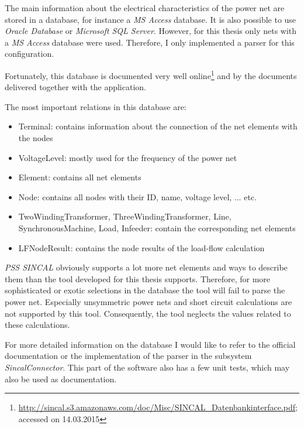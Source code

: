 The main information about the electrical characteristics of the power net are stored in a database, for instance a \emph{MS Access} database. It is also possible to use \emph{Oracle Database} or \emph{Microsoft SQL Server}. However, for this thesis only nets with a \emph{MS Access} database were used. Therefore, I only implemented a parser for this configuration.

Fortunately, this database is documented very well online\footnote{\url{http://sincal.s3.amazonaws.com/doc/Misc/SINCAL_Datenbankinterface.pdf}; accessed on 14.03.2015} and by the documents delivered together with the application.

The most important relations in this database are:
\begin{itemize}
	\item Terminal: contains information about the connection of the net elements with the nodes
	\item VoltageLevel: mostly used for the frequency of the power net
	\item Element: contains all net elements
	\item Node: contains all nodes with their ID, name, voltage level, ... etc.
	\item TwoWindingTransformer, ThreeWindingTransformer, Line, SynchronousMachine, Load, Infeeder: contain the corresponding net elements
	\item LFNodeResult: contains the node results of the load-flow calculation
\end{itemize}

\emph{PSS SINCAL} obviously supports a lot more net elements and ways to describe them than the tool developed for this thesis supports. Therefore, for more sophisticated or exotic selections in the database the tool will fail to parse the power net. Especially unsymmetric power nets and short circuit calculations are not supported by this tool. Consequently, the tool neglects the values related to these calculations.

For more detailed information on the database I would like to refer to the official documentation or the implementation of the parser in the subsystem \emph{SincalConnector}. This part of the software also has a few unit tests, which may also be used as documentation.